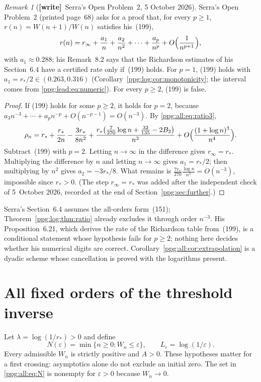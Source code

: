 \documentclass[11pt,letterpaper]{article}
\theoremstyle{remark}\newtheorem{remark}[theorem]{Remark}
\numberwithin{equation}{section}
\newcommand{\wtag}{\textup{\textbf{[write]}}}
\begin{document}
\begin{remark}[\wtag\ Serra's Open Problem~2, 5 October 2026]\label{ppg:all:rem:op2}
Serra's Open Problem~2 (printed page~68) asks for a proof that, for every $p\ge1$, $r(n)=W(n+1)/W(n)$ satisfies his~(199),
\[
 r(n)=r_\infty+\frac{a_1}n+\frac{a_2}{n^2}+\cdots+\frac{a_p}{n^p}+O\Bigl(\frac1{n^{p+1}}\Bigr),
\]
with $a_1\approx0.288$; his Remark~8.2 says that the Richardson estimates of his Section~6.4 have a certified rate only if~(199) holds. For $p=1$, (199) holds with $a_1=r_*/2\in(0.263,0.316)$ (Corollary~\ref{ppg:log:cor:monotonicity}; the interval comes from \eqref{ppg:lead:eq:numeric}). For every $p\ge2$, (199) is false.
\end{remark}
\begin{proof}
If (199) holds for some $p\ge2$, it holds for $p=2$, because $a_3n^{-3}+\cdots+a_pn^{-p}+O(n^{-p-1})=O(n^{-3})$. By \eqref{ppg:all:eq:ratio3},
\[
 \rho_n=r_*+\frac{r_*}{2n}-\frac{3r_*}{8n^2}+\frac{r_*\bigl(\frac7{270}\log n+\frac{32}{135}-2B_2\bigr)}{n^3}+O\Bigl(\frac{(1+\log n)^3}{n^4}\Bigr).
\]
Subtract~(199) with $p=2$. Letting $n\to\infty$ in the difference gives $r_\infty=r_*$. Multiplying the difference by $n$ and letting $n\to\infty$ gives $a_1=r_*/2$; then multiplying by $n^2$ gives $a_2=-3r_*/8$. What remains is $\frac{7r_*}{270}\frac{\log n}{n^3}=O(n^{-3})$, impossible since $r_*>0$. \textup{(The step $r_\infty=r_*$ was added after the independent check of 5~October 2026, recorded at the end of Section~\ref{ppg:sec:further}.)}
\end{proof}
Serra's Section~6.4 assumes the all-orders form~(151); Theorem~\ref{ppg:log:thm:ratio} already excludes it through order $n^{-3}$. His Proposition~6.21, which derives the rate of the Richardson table from~(199), is a conditional statement whose hypothesis fails for $p\ge2$; nothing here decides whether his numerical digits are correct. Corollary~\ref{ppg:all:cor:extrapolation} is a dyadic scheme whose cancellation is proved with the logarithms present.

\section{All fixed orders of the threshold inverse}\label{ppg:all:sec:inverse}
Let $\lambda=\log(1/r_*)>0$ and define
\begin{equation}\label{ppg:all:eq:N}
 N(\varepsilon)=\min\{n\ge0:W_n\le\varepsilon\},\qquad
 L_\varepsilon=\log(1/\varepsilon).
\end{equation}
Every admissible $W_n$ is strictly positive and $A>0$. These hypotheses matter for a first crossing: asymptotics alone do not exclude an initial zero. The set in \eqref{ppg:all:eq:N} is nonempty for $\varepsilon>0$ because $W_n\to0$.
\end{document}
